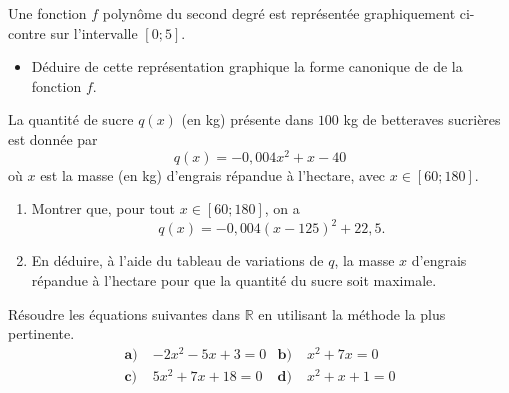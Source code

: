 \documentclass[11pt]{article}
\begin{document}
\begin{exo}
  \begin{minipage}{.47\textwidth}
  Une fonction $f$ polynôme du second degré est représentée graphiquement
  ci-contre sur l'intervalle $[0; 5]$.
  \begin{itemize}
    \item Déduire de cette représentation graphique la forme canonique de de la
      fonction $f$.
  \end{itemize}
\end{minipage}
\begin{minipage}{.47\textwidth}
  \begin{center}
\end{center}
\end{minipage}
\end{exo}

\begin{exo}
  La quantité de sucre $q(x)$ (en kg) présente dans $100$ kg de betteraves
  sucrières est donnée par
  \[
    q(x) = -0,004x^2+x-40
  \]
  où $x$ est la masse (en kg) d'engrais répandue à l'hectare, avec $x\in[60;
  180]$.
  \begin{enumerate}
    \item Montrer que, pour tout $x\in[60; 180]$, on a
      \[
        q(x) = -0,004(x-125)^2+22,5.
      \]
    \item En déduire, à l'aide du tableau de variations de $q$, la masse $x$
      d'engrais répandue à l'hectare pour que la quantité du sucre soit
      maximale.
  \end{enumerate}
\end{exo}

\begin{exo}
  Résoudre les équations suivantes dans $\mathbb{R}$ en utilisant la méthode la
  plus pertinente.
  \begin{align*}
    \textbf{a)}\;& -2x^2 - 5x +3 = 0 &
    \textbf{b)}\;& x^2 + 7x = 0 \\
    \textbf{c)}\;& 5x^2 + 7x +18 = 0 &
    \textbf{d)}\;& x^2 +x +1 = 0
  \end{align*}
\end{exo}
\end{document}
